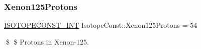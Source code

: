 \subsubsection{\texorpdfstring{Xenon125\+Protons}{Xenon125Protons}}
{\footnotesize\ttfamily \mbox{\hyperlink{group___isotope_const-_macros_ga5f18360b3e99483a35c32d789e62621c}{I\+S\+O\+T\+O\+P\+E\+C\+O\+N\+S\+T\+\_\+\+I\+NT}} Isotope\+Const\+::\+Xenon125\+Protons = 54}

\$ \$ Protons in Xenon-\/125. 